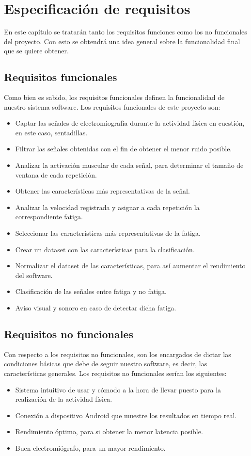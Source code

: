 \chapter{Especificación de requisitos}
En este capítulo se tratarán tanto los requisitos funciones como los no funcionales del proyecto. Con esto se obtendrá una idea general sobre la funcionalidad final que se quiere obtener.

\section{Requisitos funcionales}
Como bien es sabido, los requisitos funcionales definen la funcionalidad de nuestro sistema software. Los requisitos funcionales de este proyecto son:
\begin{itemize}
\item Captar las señales de electromiografía durante la actividad física en cuestión, en este caso, sentadillas.
\item Filtrar las señales obtenidas con el fin de obtener el menor ruido posible.
\item Analizar la activación muscular de cada señal, para determinar el tamaño de ventana de cada repetición.
\item Obtener las características más representativas de la señal.
\item Analizar la velocidad registrada y asignar a cada repetición la correspondiente fatiga.
\item Seleccionar las características más representativas de la fatiga.
\item Crear un dataset con las características para la clasificación.
\item Normalizar el dataset de las características, para así aumentar el rendimiento del software.
\item Clasificación de las señales entre fatiga y no fatiga.
\item Aviso visual y sonoro en caso de detectar dicha fatiga.


\end{itemize}

\section{Requisitos no funcionales}
Con respecto a los requisitos no funcionales, son los encargados de dictar las condiciones básicas que debe de seguir nuestro software, es decir, las características generales. Los requisitos no funcionales serían los siguientes:
\begin{itemize}
\item Sistema intuitivo de usar y cómodo a la hora de llevar puesto para la realización de la actividad física.
\item Conexión a dispositivo Android que muestre los resultados en tiempo real.
\item Rendimiento óptimo, para si obtener la menor latencia posible.
\item Buen electromiógrafo, para un mayor rendimiento.
\end{itemize}